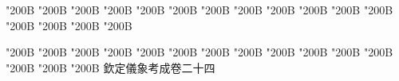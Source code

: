 \begin{正文}
\char"200B\relax{}
\char"200B\relax{}
\char"200B\relax{}
\char"200B\relax{}
\char"200B\relax{}
\char"200B\relax{}
\char"200B\relax{}
\char"200B\relax{}
\char"200B\relax{}
\char"200B\relax{}
\char"200B\relax{}
\char"200B\relax{}
\char"200B\relax{}
\char"200B\relax{}
\char"200B\relax{}
\char"200B\relax
{}\par
\char"200B\relax{}
\char"200B\relax{}
\char"200B\relax{}
\char"200B\relax{}
\char"200B\relax{}
\char"200B\relax{}
\char"200B\relax{}
\char"200B\relax{}
\char"200B\relax{}
\char"200B\relax{}
\char"200B\relax{}
\char"200B\relax{}
\char"200B\relax{}
\char"200B\relax{}
\char"200B\relax{}
欽定儀象考成卷二十四
\par

\par\end{正文}\clearpage
